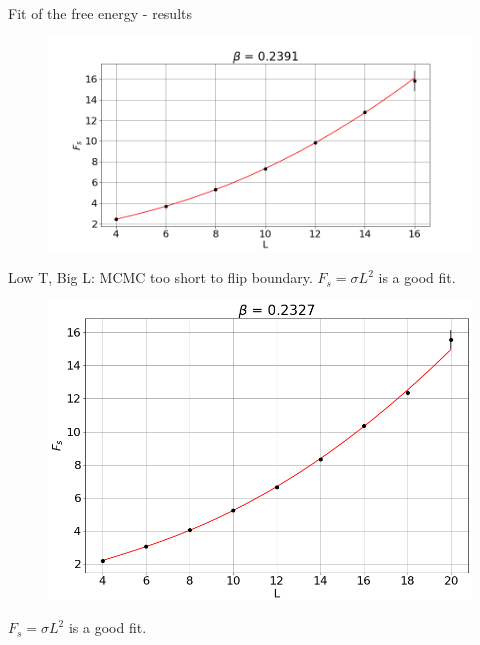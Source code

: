\documentclass[12pt,handout]{beamer}
\begin{document}
\begin{frame}{Fit of the free energy - results}\begin{center}
\begin{figure}[!htb]
\centering
\includegraphics[scale=0.4, center]{02391.png}
\end{figure}
Low T, Big L: MCMC too short to flip boundary. $F_s = \sigma L^2$ is a good fit.
\end{center}
\end{frame}

\begin{frame}
\begin{center}
\begin{figure}[!htb]
\centering
\includegraphics[scale=0.4, center]{02327.png}
\end{figure}
$F_s = \sigma L^2$ is a good fit.
\end{center}
\end{frame}
\end{document}
